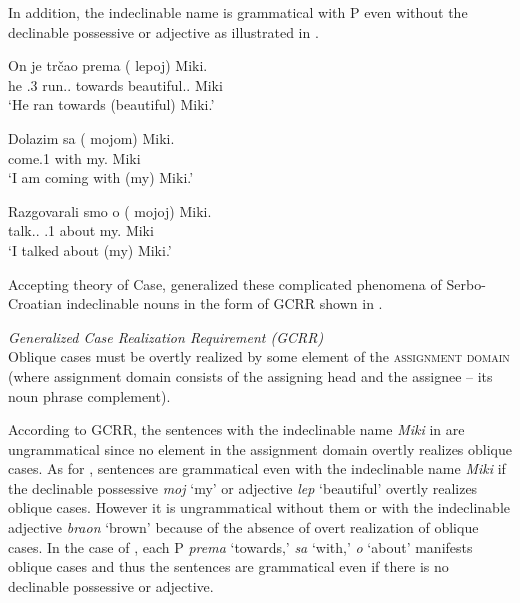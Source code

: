 \documentclass[output=paper,
]{langscibook}
\begin{document}
\noindent
In addition, the indeclinable name is grammatical with P even without the declinable possessive or adjective as illustrated in .


\begin{exe}
\ex\label{SCprep}  
\begin{xlist}
\ex
\gll	On je trčao prema (\hspace{-2pt} lepoj) Miki.\\
		he {\AUX}.3{\SG} run.{\PTCP}.{\SG} towards {} beautiful.{\DAT.\SG} Miki\\
\trans	`He ran towards (beautiful) Miki.'

\ex
\gll	Dolazim sa (\hspace{-2pt} mojom) Miki.\\
		come.{1\SG} with {} my.{\INS} Miki\\
\trans	`I am coming with (my) Miki.'

\ex
\gll	Razgovarali smo o (\hspace{-2pt} mojoj) Miki.\\
		talk.{\PTCP.\PL} {\AUX.1\PL} about {} my.{\LOC} Miki\\
\trans	`I talked about (my) Miki.'
\hfill\citep[122-123]{Horvath2014}
\end{xlist}
\end{exe}

\noindent Accepting  theory of Case, \cite{Horvath2014} generalized these complicated phenomena of   Serbo-Croatian indeclinable nouns in the form of GCRR shown in .


\begin{exe}\ex \textit{Generalized Case Realization Requirement (GCRR)} \label{GCRR}\\
Oblique cases must be overtly realized by some element of the 
\textsc{assignment domain} (where assignment domain consists of the assigning head and the assignee -- its noun phrase complement).
\hfill\citep[125]{Horvath2014}
\end{exe}

\noindent
According to GCRR, the sentences with the indeclinable name \textit{Miki} in  are ungrammatical since no element in the assignment domain overtly realizes oblique cases.
As for , sentences are grammatical even with the indeclinable name \textit{Miki} if the declinable possessive \textit{moj} `my' or adjective \textit{lep} `beautiful' overtly realizes oblique cases.
However it is ungrammatical without them or with the indeclinable adjective \textit{braon} `brown' because of the absence of overt realization of oblique cases.
In the case of , each P \textit{prema} `towards,' \textit{sa} `with,' \textit{o} `about' manifests oblique cases and thus
 the sentences are grammatical even if there is no declinable possessive or adjective.
\end{document}

